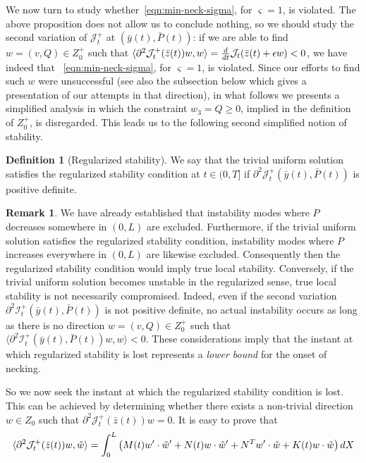 \documentclass[a4paper,10pt,twoside]{amsbook}
\numberwithin{section}{chapter}
\numberwithin{equation}{chapter}
\theoremstyle{definition}
\newtheorem{defi}[prop]{Definition}
\newtheorem{rmk}[prop]{Remark}
\DeclarePairedDelimiter{\dual}{\langle}{\rangle}
\begin{document}
We now turn to study whether~\eqref{eqn:min-neck-sigma}, for $\varsigma=1$, is violated. The above proposition does not allow us to conclude nothing, so we should study the second variation of $\mathcal{J}_t^+$ at $(\bar{y}(t),\bar P(t))$: if we are able to find $w=(v,Q)\in Z_0^+$ such that $\dual{\partial^2\mathcal{J}_t^+(\bar z(t))w,w}=\frac{d}{dt}\mathcal{J}_t(\bar z(t)+\epsilon w)<0$, we have indeed that ~\eqref{eqn:min-neck-sigma}, for $\varsigma=1$, is violated. Since our efforts to find such $w$ were unsuccessful (see also the subsection below which gives a presentation of our attempts in that direction), in what follows we presents a simplified analysis in which the constraint $w_3=Q\ge0$, implied in the definition of $Z_0^+$, is disregarded. This leads us to the following second simplified notion of stability.
\begin{defi}[Regularized stability]
We say that the trivial uniform solution satisfies the regularized stability condition at $t\in(0,T]$ if $\partial^2\mathcal{J}_t^+(\bar y(t),\bar P(t))$ is positive definite.
\end{defi}
\begin{rmk}
\label{rmk:stability-regularized}
We have already established that instability modes where $P$ decreases somewhere in $(0,L)$ are excluded. Furthermore, if the trivial uniform solution satisfies the regularized stability condition, instability modes where $P$ increases everywhere in $(0,L)$ are likewise excluded. Consequently then the regularized stability condition would imply true local stability. Conversely, if the trivial uniform solution becomes unstable in the regularized sense, true local stability is not necessarily compromised. Indeed, even if the second variation $\partial^2\mathcal{I}_t^+(\bar{y}(t),\bar{P}(t))$ is not positive definite, no actual instability occurs as long as there is no direction $w=(v,Q) \in Z_0^+$ such that $\langle\partial^2\mathcal{I}_t^+(\bar{y}(t),\bar{P}(t))w,w\rangle<0$. These considerations imply that the instant at which regularized stability is lost represents a \emph{lower bound} for the onset of necking.
\end{rmk}
So we now seek the instant at which the regularized stability condition is lost. This can be achieved by determining whether there exists a non-trivial direction $w\in Z_0$ such that $\partial^2\mathcal{J}_t^+(\bar{z}(t))w = 0$. It is easy to prove that
\[
\dual{\partial^2\mathcal{J}_t^+(\bar z(t))w,\tilde w}=\int_0^L\left(M(t)w'\cdot \tilde w'+N(t)w\cdot\tilde w'+N^Tw'\cdot\tilde w+K(t)w\cdot\tilde w\right)dX
\]
\end{document}
